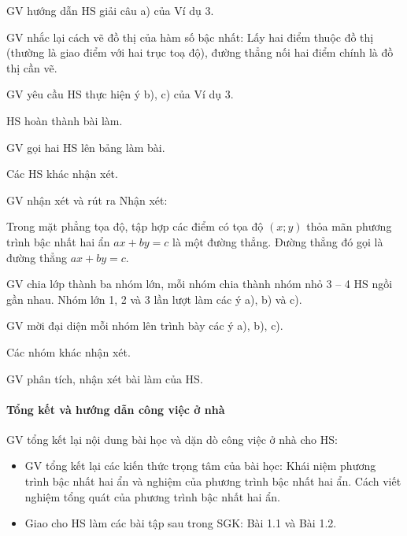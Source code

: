 \begin{tcth}[vidu=3]
    \buocmot
    \item GV hướng dẫn HS giải câu a) của Ví dụ 3. 
    \item GV nhắc lại cách vẽ đồ thị của hàm số bậc nhất: Lấy hai điểm thuộc đồ thị (thường là giao điểm	với hai trục toạ độ), đường thẳng nối hai điểm chính là đồ thị cần vẽ.
    \item GV yêu cầu HS thực hiện ý b), c) của Ví dụ 3. 
    \buochai
    \item HS hoàn thành bài làm.
    \item GV gọi hai HS lên bảng làm bài.
    \buocba
    \item Các HS khác nhận xét.
    \buocbon
    \item GV nhận xét và rút ra Nhận xét:
    \begin{nhanxet}
        Trong mặt phẳng tọa độ, tập hợp các điểm có tọa độ $(x; y)$ thỏa mãn phương trình bậc nhất hai ẩn $ax + by = c$ là một đường thẳng. Đường thẳng đó gọi là đường thẳng $ax + by = c$.
    \end{nhanxet}
\end{tcth}

\begin{tcth}[luyentap=2]
    \buocmot
    \item GV chia lớp thành ba nhóm lớn, mỗi nhóm chia thành nhóm nhỏ 3 – 4 HS ngồi gần nhau. Nhóm lớn 1, 2 và 3 lần lượt làm các ý a), b) và c).
    \buochai
    \item GV mời đại diện mỗi nhóm lên trình bày các ý a), b), c).
    \buocba
    \item Các nhóm khác nhận xét.
    \buocbon
    \item GV phân tích, nhận xét bài làm của HS. 
\end{tcth}

\paragraph{Tổng kết và hướng dẫn công việc ở nhà}

GV tổng kết lại nội dung bài học và dặn dò công việc ở nhà cho HS:

\begin{itemize}
    \item GV tổng kết lại các kiến thức trọng tâm của bài học: Khái niệm phương trình bậc nhất hai ẩn và nghiệm của phương trình bậc nhất hai ẩn. Cách viết nghiệm tổng quát của phương trình bậc nhất hai ẩn.
    \item Giao cho HS làm các bài tập sau trong SGK: Bài 1.1 và Bài 1.2. 
\end{itemize}

